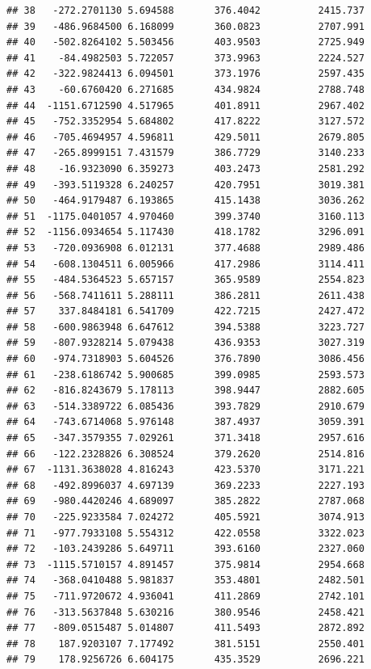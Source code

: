 \documentclass[
]{article}
\begin{document}
\begin{verbatim}
## 38   -272.2701130 5.694588       376.4042          2415.737
## 39   -486.9684500 6.168099       360.0823          2707.991
## 40   -502.8264102 5.503456       403.9503          2725.949
## 41    -84.4982503 5.722057       373.9963          2224.527
## 42   -322.9824413 6.094501       373.1976          2597.435
## 43    -60.6760420 6.271685       434.9824          2788.748
## 44  -1151.6712590 4.517965       401.8911          2967.402
## 45   -752.3352954 5.684802       417.8222          3127.572
## 46   -705.4694957 4.596811       429.5011          2679.805
## 47   -265.8999151 7.431579       386.7729          3140.233
## 48    -16.9323090 6.359273       403.2473          2581.292
## 49   -393.5119328 6.240257       420.7951          3019.381
## 50   -464.9179487 6.193865       415.1438          3036.262
## 51  -1175.0401057 4.970460       399.3740          3160.113
## 52  -1156.0934654 5.117430       418.1782          3296.091
## 53   -720.0936908 6.012131       377.4688          2989.486
## 54   -608.1304511 6.005966       417.2986          3114.411
## 55   -484.5364523 5.657157       365.9589          2554.823
## 56   -568.7411611 5.288111       386.2811          2611.438
## 57    337.8484181 6.541709       422.7215          2427.472
## 58   -600.9863948 6.647612       394.5388          3223.727
## 59   -807.9328214 5.079438       436.9353          3027.319
## 60   -974.7318903 5.604526       376.7890          3086.456
## 61   -238.6186742 5.900685       399.0985          2593.573
## 62   -816.8243679 5.178113       398.9447          2882.605
## 63   -514.3389722 6.085436       393.7829          2910.679
## 64   -743.6714068 5.976148       387.4937          3059.391
## 65   -347.3579355 7.029261       371.3418          2957.616
## 66   -122.2328826 6.308524       379.2620          2514.816
## 67  -1131.3638028 4.816243       423.5370          3171.221
## 68   -492.8996037 4.697139       369.2233          2227.193
## 69   -980.4420246 4.689097       385.2822          2787.068
## 70   -225.9233584 7.024272       405.5921          3074.913
## 71   -977.7933108 5.554312       422.0558          3322.023
## 72   -103.2439286 5.649711       393.6160          2327.060
## 73  -1115.5710157 4.891457       375.9814          2954.668
## 74   -368.0410488 5.981837       353.4801          2482.501
## 75   -711.9720672 4.936041       411.2869          2742.101
## 76   -313.5637848 5.630216       380.9546          2458.421
## 77   -809.0515487 5.014807       411.5493          2872.892
## 78    187.9203107 7.177492       381.5151          2550.401
## 79    178.9256726 6.604175       435.3529          2696.221

\end{verbatim}
\end{document}
